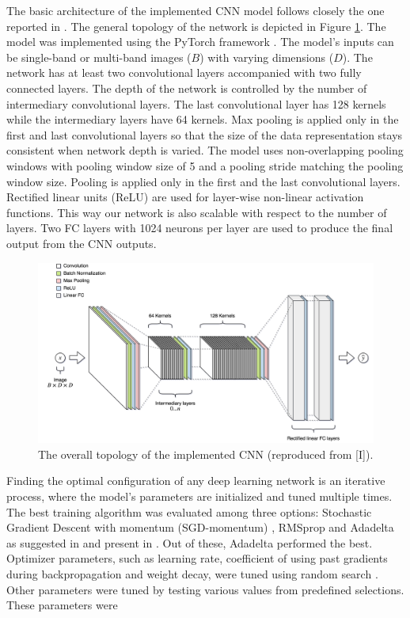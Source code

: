 The basic architecture of the implemented CNN model follows closely the one reported in \cite{Krizhevsky2017a}. The general topology of the network is depicted in Figure \ref{fig:i-cnn}. The model was implemented using the PyTorch framework \cite{paszke2017automatic}. The model's inputs can be single-band or multi-band images ($B$) with varying dimensions ($D$). The network has at least two convolutional layers accompanied with two fully connected layers. The depth of the network is controlled by the number of intermediary convolutional layers. The last convolutional layer has 128 kernels while the intermediary layers have 64 kernels. Max pooling is applied only in the first and last convolutional layers so that the size of the data representation stays consistent when network depth is varied. The model uses non-overlapping pooling windows with pooling window size of 5 and a pooling stride matching the pooling window size. Pooling is applied only in the first and the last convolutional layers. Rectified linear units (ReLU) \cite{He2015} are used for layer-wise non-linear activation functions. This way our network is also scalable with respect to the number of layers. Two FC layers with 1024 neurons per layer are used to produce the final output from the CNN outputs.

\begin{figure}[ht]
\centering
\includegraphics[width = \textwidth]{Images/i-cnn.png}
\caption{The overall topology of the implemented CNN (reproduced from [I]). }
\label{fig:i-cnn}
\end{figure}

Finding the optimal configuration of any deep learning network is an iterative process, where the model's parameters are initialized and tuned multiple times. The best training algorithm was evaluated among three options: Stochastic Gradient Descent with momentum (SGD-momentum) \cite{Bottou1998}, RMSprop \cite{Hinton2014} and Adadelta \cite{Zeiler2012} as suggested in \cite{Goodfellow-et-al-2016} and present in \cite{Karpathy2017}. Out of these, Adadelta performed the best. Optimizer parameters, such as learning rate, coefficient of using past gradients during backpropagation and weight decay, were tuned using random search \cite{Bergstra2012}. Other parameters were tuned by testing various values from predefined selections. These parameters were

